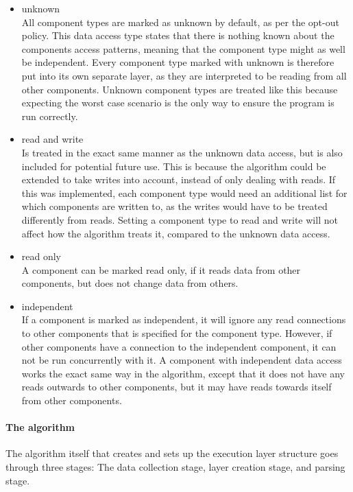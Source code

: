 \begin{itemize}
    \item unknown\\
    All component types are marked as unknown by default, as per the opt-out policy.
    This data access type states that there is nothing known about the components access patterns, meaning that the component type might as well be independent.
    Every component type marked with unknown is therefore put into its own separate layer, as they are interpreted to be reading from all other components.
    Unknown component types are treated like this because expecting the worst case scenario is the only way to ensure the program is run correctly.

    \item read and write\\
    Is treated in the exact same manner as the unknown data access, but is also included for potential future use.
    This is because the algorithm could be extended to take writes into account, instead of only dealing with reads.
    If this was implemented, each component type would need an additional list for which components are written to, as the writes would have to be treated differently from reads.
    Setting a component type to read and write will not affect how the algorithm treats it, compared to the unknown data access.

    \item read only\\
    A component can be marked read only, if it reads data from other components, but does not change data from others.

    \item independent\\
    If a component is marked as independent, it will ignore any read connections to other components that is specified for the component type.
    However, if other components have a connection to the independent component, it can not be run concurrently with it.
    A component with independent data access works the exact same way in the algorithm, except that it does not have any reads outwards to other components, but it may have reads towards itself from other components.
\end{itemize}

\paragraph{The algorithm}
The algorithm itself that creates and sets up the execution layer structure goes through three stages: The data collection stage, layer creation stage, and parsing stage.


